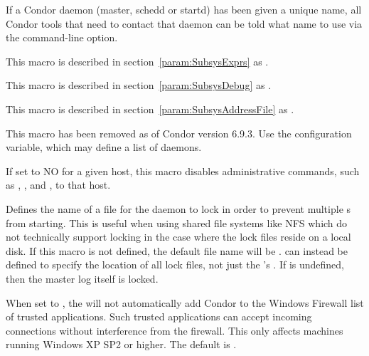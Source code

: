 \begin{description}
  If a Condor daemon (master, schedd or startd) has been given a
  unique name, all Condor tools that need to contact that daemon can
  be told what name to use via the  command-line option.


\item[\Macro{MASTER\_ATTRS}] \label{param:MasterExprs} This macro is
  described in section~\ref{param:SubsysExprs} as
  .

\item[\Macro{MASTER\_DEBUG}] \label{param:MasterDebug} This macro
  is described in section~\ref{param:SubsysDebug} as
  .

\item[\Macro{MASTER\_ADDRESS\_FILE}] \label{param:MasterAddressFile}
  This macro is described in
  section~\ref{param:SubsysAddressFile} as
  . 

\item[\Macro{SECONDARY\_COLLECTOR\_LIST}]
  \label{param:SecondaryCollectorList} This macro has been removed
  as of Condor version 6.9.3.
  Use the  configuration variable, which may define a
  list of  daemons.

\item[\Macro{ALLOW\_ADMIN\_COMMANDS}]
  \label{param:AllowAdminCommands} If set to NO for a given host, this
  macro disables administrative commands, such as 
  , , and , to that host.

\item[\Macro{MASTER\_INSTANCE\_LOCK}] \label{param:MasterInstanceLock}
  Defines the name of a file for the  daemon
  to lock in order to prevent multiple s
  from starting.
  This is useful when using shared file systems like NFS which do
  not technically support locking in the case where the lock files
  reside on a local disk.
  If this macro is not defined, the default file name will be
  .
   can instead be defined to
  specify the location of all lock files, not just the 
  's .
  If  is undefined, then the master log itself is locked.

\item[\Macro{ADD\_WINDOWS\_FIREWALL\_EXCEPTION}]
  \label{param:AddWindowsFirewallException} When set to , the
   will not automatically add Condor to the Windows
  Firewall list of trusted applications. Such trusted applications can
  accept incoming connections without interference from the firewall. This
  only affects machines running Windows XP SP2 or higher. The default
  is .


\end{description}
